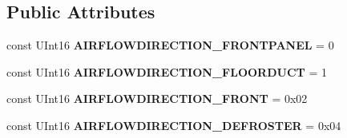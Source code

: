 \subsection*{Public Attributes}
\begin{DoxyCompactItemize}
\item 
\hypertarget{interfaceVehiclePropertyType_a1f0e12a84b69b870c483bf44982988b9}{const U\+Int16 {\bfseries A\+I\+R\+F\+L\+O\+W\+D\+I\+R\+E\+C\+T\+I\+O\+N\+\_\+\+F\+R\+O\+N\+T\+P\+A\+N\+E\+L} = 0}\label{interfaceVehiclePropertyType_a1f0e12a84b69b870c483bf44982988b9}

\item 
\hypertarget{interfaceVehiclePropertyType_ac72eaf046f4d3fcb2b40843d3723ac77}{const U\+Int16 {\bfseries A\+I\+R\+F\+L\+O\+W\+D\+I\+R\+E\+C\+T\+I\+O\+N\+\_\+\+F\+L\+O\+O\+R\+D\+U\+C\+T} = 1}\label{interfaceVehiclePropertyType_ac72eaf046f4d3fcb2b40843d3723ac77}

\item 
\hypertarget{interfaceVehiclePropertyType_aad206ea60884f08c0397e16c1ea5e07b}{const U\+Int16 {\bfseries A\+I\+R\+F\+L\+O\+W\+D\+I\+R\+E\+C\+T\+I\+O\+N\+\_\+\+F\+R\+O\+N\+T} = 0x02}\label{interfaceVehiclePropertyType_aad206ea60884f08c0397e16c1ea5e07b}

\item 
\hypertarget{interfaceVehiclePropertyType_aa200bb713a7ef0f40ab50d8dbef307b6}{const U\+Int16 {\bfseries A\+I\+R\+F\+L\+O\+W\+D\+I\+R\+E\+C\+T\+I\+O\+N\+\_\+\+D\+E\+F\+R\+O\+S\+T\+E\+R} = 0x04}\label{interfaceVehiclePropertyType_aa200bb713a7ef0f40ab50d8dbef307b6}


\end{DoxyCompactItemize}
